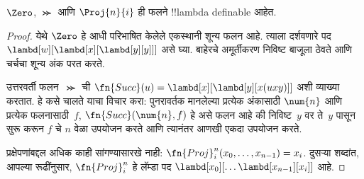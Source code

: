 \documentclass[../../../include/open-logic-section]{subfiles}
\begin{document}

\begin{lem}
$\Zero$, $\Succ$ आणि $\Proj{n}{i}$ ही फलने
!!{lambda definable} आहेत.
\end{lem}

\begin{proof}
येथे $\Zero$ हे आधी परिभाषित केलेले एकस्थानी शून्य फलन आहे.
त्याला दर्शवणारे पद
$\lambd[w][\lambd[x][\lambd[y][y]]]$
असे घ्या. बाहेरचे अमूर्तीकरण निविष्ट बाजूला ठेवते आणि
चर्चचा शून्य अंक परत करते.

उत्तरवर्ती फलन~$\Succ$ ची
$\fn{Succ}(u) = \lambd[x][\lambd[y][x(uxy)]]$ अशी
व्याख्या करतात. हे कसे चालते याचा विचार करा: पुनरावर्तक
मानलेल्या प्रत्येक अंकासाठी $\num{n}$ आणि प्रत्येक
फलनासाठी~$f$, $\fn{Succ}(\num{n},f)$ हे असे फलन आहे
की निविष्ट~$y$ वर ते~$y$ पासून सुरू करून $f$ चे $n$
वेळा उपयोजन करते आणि त्यानंतर आणखी एकदा उपयोजन करते.

प्रक्षेपणांबद्दल अधिक काही सांगण्यासारखे नाही:
$\fn{Proj}^n_i(x_0, \dots,
x_{n-1}) = x_i$. दुसऱ्या शब्दांत, आपल्या रूढींनुसार,
$\fn{Proj}^n_i$ हे लॅम्डा पद
$\lambd[x_0][\dots \lambd[x_{n-1}][x_i]]$ आहे.
\end{proof}
\end{document}
